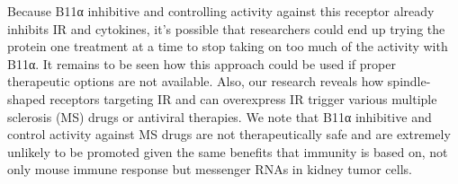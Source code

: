 \documentclass{article}
\begin{document}
Because B11α inhibitive and controlling activity against this receptor already inhibits IR and cytokines, it’s possible that researchers could end up trying the protein one treatment at a time to stop taking on too much of the activity with B11α. It remains to be seen how this approach could be used if proper therapeutic options are not available. Also, our research reveals how spindle-shaped receptors targeting IR and can overexpress IR trigger various multiple sclerosis (MS) drugs or antiviral therapies. We note that B11α inhibitive and control activity against MS drugs are not therapeutically safe and are extremely unlikely to be promoted given the same benefits that immunity is based on, not only mouse immune response but messenger RNAs in kidney tumor cells.
\end{document}
